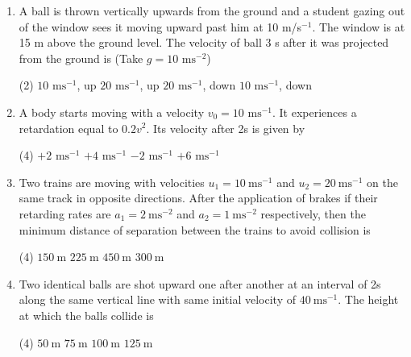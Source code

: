 \documentclass{article}
\begin{document}
\begin{enumerate}
  
    \item A ball is thrown vertically upwards from the ground and a student gazing out of the window sees it moving upward past him at 10 m/s\(^{-1}\). The window is at 15 m above the ground level. The velocity of ball 3 s after it was projected from the ground is (Take \(g = 10 \text{ ms}^{-2}\))
    \begin{tasks}(2)
        \task \(10 \text{ ms}^{-1}\), up
        \task \(20 \text{ ms}^{-1}\), up
        \task \(20 \text{ ms}^{-1}\), down
        \task \(10 \text{ ms}^{-1}\), down
    \end{tasks}
    
    \item A body starts moving with a velocity \(v_0 = 10 \text{ ms}^{-1}\). It experiences a retardation equal to \(0.2v^2\). Its velocity after 2s is given by
    \begin{tasks}(4)
        \task \(+ 2 \text{ ms}^{-1}\)
        \task \(+ 4 \text{ ms}^{-1}\)
        \task \(- 2 \text{ ms}^{-1}\)
        \task \(+ 6 \text{ ms}^{-1}\)
    \end{tasks}

    \item Two trains are moving with velocities \(u_1 = 10\ \text{ms}^{-1}\) and \(u_2 = 20\ \text{ms}^{-1}\) on the same track in opposite directions. After the application of brakes if their retarding rates are \(a_1 = 2\ \text{ms}^{-2}\) and \(a_2 = 1\ \text{ms}^{-2}\) respectively, then the minimum distance of separation between the trains to avoid collision is 
    \begin{tasks}(4)
        \task \(150\ \text{m}\)
        \task \(225\ \text{m}\)
        \task \(450\ \text{m}\)
        \task \(300\ \text{m}\)
    \end{tasks}

    \item Two identical balls are shot upward one after another at an interval of 2s along the same vertical line with same initial velocity of \(40\ \text{ms}^{-1}\). The height at which the balls collide is
    \begin{tasks}(4)
        \task \(50\ \text{m}\)
        \task \(75\ \text{m}\)
        \task \(100\ \text{m}\)
        \task \(125\ \text{m}\)
    \end{tasks}


\end{enumerate}
\end{document}
